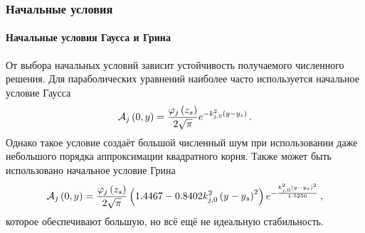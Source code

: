 \documentclass[../document.tex]{subfiles}
\begin{document}
			\subsubsection{Начальные условия}
				\paragraph{Начальные условия Гаусса и Грина}
					\par От выбора начальных условий зависит устойчивость получаемого численного решения. Для параболических уравнений наиболее часто используется начальное условие Гаусса \cite{jensen}
					\begin{equation}\label{eq::gauss}
						\mathcal{A}_j\left(0,y\right)=\frac{\varphi_j\left(z_s\right)}{2\sqrt{\pi}}e^{-k_{j,0}^2\left(y-y_s\right)}\,.
					\end{equation}
					Однако такое условие создаёт большой численный шум при использовании даже небольшого порядка аппроксимации квадратного корня. Также может быть использовано начальное условие Грина
					\begin{equation}\label{eq::greene}
						\mathcal{A}_j\left(0,y\right)=\frac{\varphi_j\left(z_s\right)}{2\sqrt{\pi}}\left(1.4467-0.8402k_{j,0}^2\left(y-y_s\right)^2\right)e^{-\frac{k_{j,0}^2\left(y-y_s\right)^2}{1.5256}}\,,
					\end{equation}
					которое обеспечивают большую, но всё ещё не идеальную стабильность.
\end{document}
